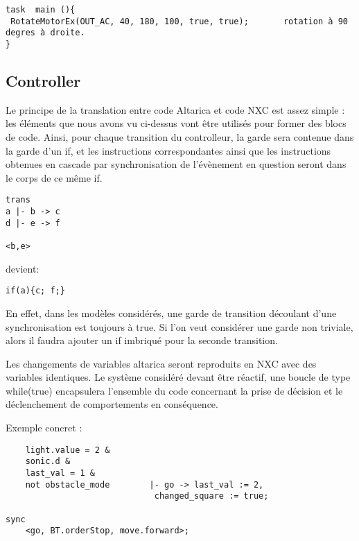 \begin{verbatim}
task  main (){
 RotateMotorEx(OUT_AC, 40, 180, 100, true, true);		rotation à 90 degres à droite.
}

\end{verbatim}

\subsection{Controller}

Le principe de la translation entre code Altarica et code NXC est assez simple : les éléments que nous avons vu ci-dessus vont être utilisés pour former des blocs de code. Ainsi, pour chaque transition du controlleur, la garde sera contenue dans la garde d'un if, et les instructions correspondantes ainsi que les instructions obtenues en cascade par synchronisation de l'évènement en question seront dans le corps de ce même if.

\begin{verbatim}
trans
a |- b -> c
d |- e -> f

<b,e>
\end{verbatim}

devient:

\begin{verbatim}
if(a){c; f;}
\end{verbatim}

En effet, dans les modèles considérés, une garde de transition découlant d'une synchronisation est toujours à true. Si l'on veut considérer une garde non triviale, alors il faudra ajouter un if imbriqué pour la seconde transition.\newline

Les changements de variables altarica seront reproduits en NXC avec des variables identiques. Le système considéré devant être réactif, une boucle de type while(true) encapsulera l'ensemble du code concernant la prise de décision et le déclenchement de comportements en conséquence.\newline

Exemple concret :\newline

\begin{verbatim}
    light.value = 2 & 
    sonic.d &
    last_val = 1 &
    not obstacle_mode	     |- go -> last_val := 2, 
    			     	      changed_square := true;
  
sync
    <go, BT.orderStop, move.forward>;
\end{verbatim}

